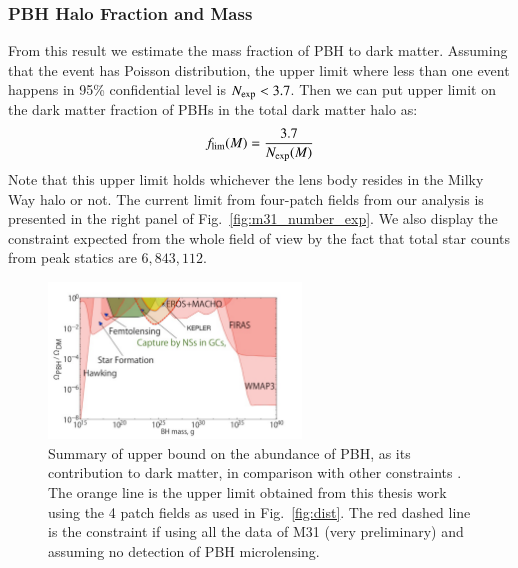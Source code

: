 \documentclass[iop, apj]{emulateapj}
\newcommand{\?}{\stackrel{?}{=}}
\begin{document}
\subsubsection{PBH Halo Fraction and Mass}
From this result we estimate the mass fraction of PBH to dark matter. 
Assuming that the event has Poisson distribution, 
the upper limit where less than one event happens in 95\% confidential level is $N_{\rm exp}<3.7$. 
Then we can put upper limit on the dark matter fraction of PBHs in the total dark matter halo as:
%
\begin{eqnarray}
f_{\rm lim}(M)=\frac{3.7}{N_{\rm exp}(M)}
\end{eqnarray}
%
Note that this upper limit holds whichever the lens body resides in the Milky Way halo or not. 
The current limit from four-patch fields 
from our analysis is presented in the right panel of Fig.~\ref{fig:m31_number_exp}.  
We also display the constraint expected from the whole field of view by the fact that 
total star counts from peak statics are $6,843,112$. 
%
\begin{figure}
\centering
\includegraphics[width=0.6\textwidth]{pic/s14b_fig2-eps-converted-to.pdf}
\caption{\small{Summary of upper bound on the abundance of PBH, as its contribution to dark matter, in comparison with other constraints \citep{Capelaetal:13}. The orange line is the upper limit obtained from this thesis work using the 4 patch fields as used in Fig.~\ref{fig:dist}. The red dashed line is the constraint if using all the data of M31 (very preliminary) and assuming no detection of PBH microlensing. }}
\label{fig:pbhconst}
\end{figure}


\end{document}
